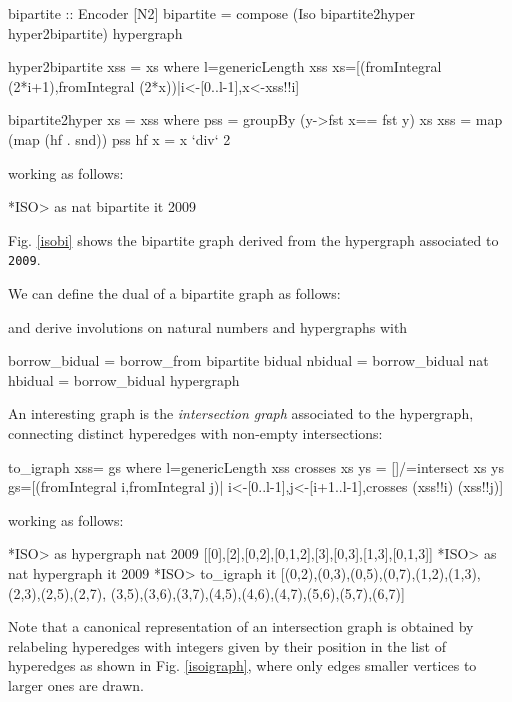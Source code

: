 \documentclass[]{INCLUDES/llncs}
\begin{document}
\begin{code}
bipartite :: Encoder [N2]
bipartite = compose (Iso bipartite2hyper hyper2bipartite) hypergraph
 
hyper2bipartite xss = xs where
  l=genericLength xss
  xs=[(fromIntegral (2*i+1),fromIntegral (2*x))|i<-[0..l-1],x<-xss!!i]

bipartite2hyper xs = xss where
  pss = groupBy (\x y->fst x== fst y)  xs
  xss = map (map (hf . snd)) pss
  hf x = x `div` 2
\end{code}
working as follows:
\begin{codex}
[(1,0),(3,4),(5,0),(5,4),(7,0),(7,2),(7,4),(9,6),(11,0),
 (11,6),(13,2),(13,6),(15,0),(15,2),(15,6)]
*ISO> as nat bipartite it
2009
\end{codex}
Fig. \ref{isobi} shows the bipartite graph derived from the hypergraph
associated to {\tt 2009}.

We can define the dual of a bipartite graph as follows:
and derive involutions on natural numbers and hypergraphs with
\begin{code}
borrow_bidual = borrow_from bipartite bidual
nbidual = borrow_bidual nat
hbidual = borrow_bidual hypergraph
\end{code}

\begin{codex}

\end{codex}

An interesting  graph is the {\em intersection graph} associated to the
hypergraph, connecting distinct hyperedges with non-empty intersections:
\begin{code}
to_igraph xss= gs where  
  l=genericLength xss
  crosses xs ys = []/=intersect xs ys
  gs=[(fromIntegral i,fromIntegral j)|
     i<-[0..l-1],j<-[i+1..l-1],crosses (xss!!i) (xss!!j)]
\end{code}
working as follows:
\begin{codex}
*ISO> as hypergraph nat 2009
[[0],[2],[0,2],[0,1,2],[3],[0,3],[1,3],[0,1,3]]
*ISO> as nat hypergraph it
2009
*ISO> to_igraph it
[(0,2),(0,3),(0,5),(0,7),(1,2),(1,3),(2,3),(2,5),(2,7),
 (3,5),(3,6),(3,7),(4,5),(4,6),(4,7),(5,6),(5,7),(6,7)]
\end{codex}
Note that a canonical representation of an intersection graph is obtained by
relabeling hyperedges with integers given by their position in the list of
hyperedges as shown in Fig. \ref{isoigraph}, where only edges 
smaller vertices to larger ones are drawn.
\end{document}
